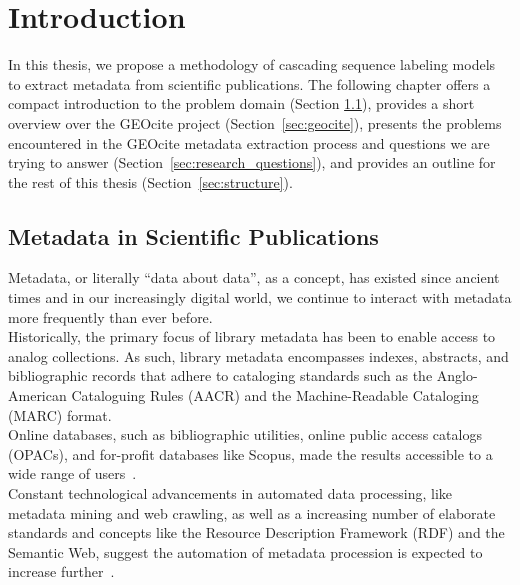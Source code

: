 \chapter{Introduction}\label{chap:introduction}
In this thesis, we propose a methodology of cascading sequence labeling models to extract metadata from scientific publications. The following chapter offers a compact introduction to the problem domain (Section \ref{sec:problem_domain}), provides a short overview over the GEOcite project (Section~\ref{sec:geocite}), presents the problems encountered in the GEOcite metadata extraction process and questions we are trying to answer (Section~\ref{sec:research_questions}), and provides an outline for the rest of this thesis (Section~\ref{sec:structure}). 

\section{Metadata in Scientific Publications}\label{sec:problem_domain}
Metadata, or literally \enquote{data about data}, as a concept, has existed since ancient times and in our increasingly digital world, we continue to interact with metadata more frequently than ever before.\\
Historically, the primary focus of library metadata has been to enable access to analog collections. As such, library metadata encompasses indexes, abstracts, and bibliographic records that adhere to cataloging standards such as the Anglo-American Cataloguing Rules (AACR) and the Machine-Readable Cataloging (MARC) format.\\
Online databases, such as bibliographic utilities, online public access catalogs (OPACs), and for-profit databases like Scopus, made the results accessible to a wide range of users~\cite{schmidt1997libraries}.\\
Constant technological advancements in automated data processing, like metadata mining and web crawling, as well as a increasing number of elaborate standards and concepts like the Resource Description Framework (RDF) and the Semantic Web, suggest the automation of metadata procession is expected to increase further~\cite{gill2008introduction}.
\newpage

